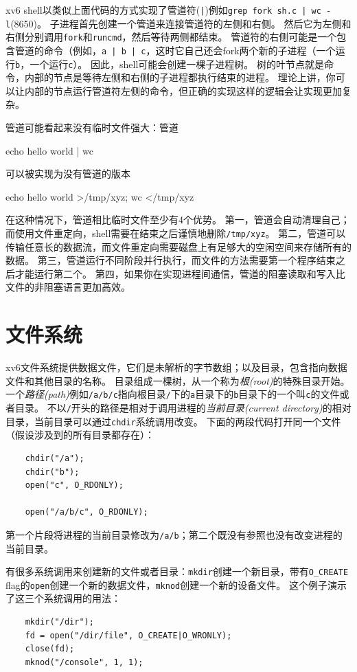 xv6 shell以类似上面代码的方式实现了管道符(\texttt{|})例如\texttt{grep fork sh.c | wc -l}(8650)。
子进程首先创建一个管道来连接管道符的左侧和右侧。
然后它为左侧和右侧分别调用\texttt{fork}和\texttt{runcmd}，然后等待两侧都结束。
管道符的右侧可能是一个包含管道的命令（例如，\texttt{a | b | c}，这时它自己还会fork两个新的子进程（一个运行\texttt{b}，一个运行\texttt{c}）。
因此，shell可能会创建一棵子进程树。
树的叶节点就是命令，内部的节点是等待左侧和右侧的子进程都执行结束的进程。
理论上讲，你可以让内部的节点运行管道符左侧的命令，但正确的实现这样的逻辑会让实现更加复杂。

管道可能看起来没有临时文件强大：管道
\begin{blacklisting}
    echo hello world | wc    
\end{blacklisting}
可以被实现为没有管道的版本
\begin{blacklisting}
    echo hello world >/tmp/xyz; wc </tmp/xyz
\end{blacklisting}

在这种情况下，管道相比临时文件至少有4个优势。
第一，管道会自动清理自己；而使用文件重定向，shell需要在结束之后谨慎地删除\texttt{/tmp/xyz}。
第二，管道可以传输任意长的数据流，而文件重定向需要磁盘上有足够大的空闲空间来存储所有的数据。
第三，管道运行不同阶段并行执行，而文件的方法需要第一个程序结束之后才能运行第二个。
第四，如果你在实现进程间通信，管道的阻塞读取和写入比文件的非阻塞语言更加高效。

\section{文件系统}
xv6文件系统提供数据文件，它们是未解析的字节数组；以及目录，包含指向数据文件和其他目录的名称。
目录组成一棵树，从一个称为\emph{根(root)}的特殊目录开始。
一个\emph{路径(path)}例如\texttt{/a/b/c}指向根目录\texttt{/}下的\texttt{a}目录下的\texttt{b}目录下的一个叫\texttt{c}的文件或者目录。
不以\texttt{/}开头的路径是相对于调用进程的\emph{当前目录(current directory)}的相对目录，当前目录可以通过\texttt{chdir}系统调用改变。
下面的两段代码打开同一个文件（假设涉及到的所有目录都存在）：
\begin{lstlisting}
    chdir("/a");
    chdir("b");
    open("c", O_RDONLY);

    open("/a/b/c", O_RDONLY);
\end{lstlisting}
第一个片段将进程的当前目录修改为\texttt{/a/b}；第二个既没有参照也没有改变进程的当前目录。

有很多系统调用来创建新的文件或者目录：\texttt{mkdir}创建一个新目录，带有\texttt{O\_CREATE} flag的\texttt{open}创建一个新的数据文件，\texttt{mknod}创建一个新的设备文件。
这个例子演示了这三个系统调用的用法：
\begin{lstlisting}
    mkdir("/dir");
    fd = open("/dir/file", O_CREATE|O_WRONLY);
    close(fd);
    mknod("/console", 1, 1);
\end{lstlisting}

